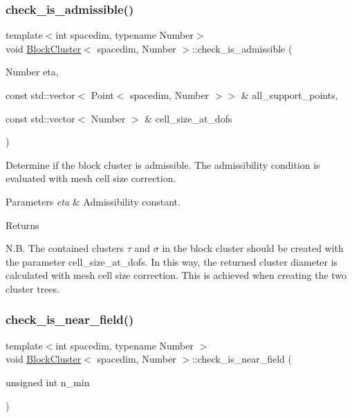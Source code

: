 \mbox{\label{classBlockCluster_a79e83ccbdb52032b6b2d83e7d095e62d}} 
\subsubsection{\texorpdfstring{check\+\_\+is\+\_\+admissible()}{check\_is\_admissible()}\hspace{0.1cm}{\footnotesize\ttfamily [2/2]}}
{\footnotesize\ttfamily template$<$int spacedim, typename Number$>$ \\
void \hyperlink{classBlockCluster}{Block\+Cluster}$<$ spacedim, Number $>$\+::check\+\_\+is\+\_\+admissible (\begin{DoxyParamCaption}\item[{Number}]{eta,  }\item[{const std\+::vector$<$ Point$<$ spacedim, Number $>$$>$ \&}]{all\+\_\+support\+\_\+points,  }\item[{const std\+::vector$<$ Number $>$ \&}]{cell\+\_\+size\+\_\+at\+\_\+dofs }\end{DoxyParamCaption})}

Determine if the block cluster is admissible. The admissibility condition is evaluated with mesh cell size correction.


\begin{DoxyParams}{Parameters}
{\em eta} & Admissibility constant. \\
\hline
\end{DoxyParams}
\begin{DoxyReturn}{Returns}

\end{DoxyReturn}
N.\+B. The contained clusters $\tau$ and $\sigma$ in the block cluster should be created with the parameter {\ttfamily cell\+\_\+size\+\_\+at\+\_\+dofs}. In this way, the returned cluster diameter is calculated with mesh cell size correction. This is achieved when creating the two cluster trees.\mbox{\label{classBlockCluster_a44900c760eac0578f700fa678ef4e416}} 
\subsubsection{\texorpdfstring{check\+\_\+is\+\_\+near\+\_\+field()}{check\_is\_near\_field()}}
{\footnotesize\ttfamily template$<$int spacedim, typename Number $>$ \\
void \hyperlink{classBlockCluster}{Block\+Cluster}$<$ spacedim, Number $>$\+::check\+\_\+is\+\_\+near\+\_\+field (\begin{DoxyParamCaption}\item[{unsigned int}]{n\+\_\+min }\end{DoxyParamCaption})}

